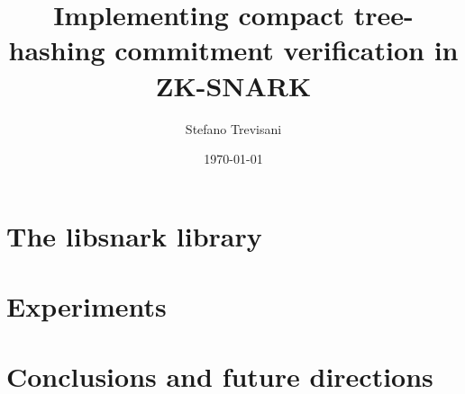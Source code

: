 \documentclass{article}
\author{Stefano Trevisani}
\date{\today}
\title{Implementing compact tree-hashing commitment verification in ZK-SNARK}
\theoremstyle{definition}
\theoremstyle{theorem}
\theoremstyle{example}
\begin{document}
\maketitle




\section{The libsnark library}\label{sec:libsnark}

\section{Experiments}\label{sec:experiments}

\section{Conclusions and future directions}\label{sec:conclusions}
\end{document}
